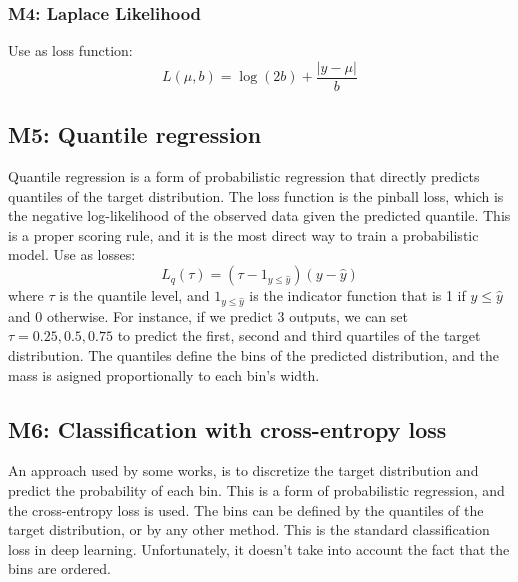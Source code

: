 \documentclass{article}
\begin{document}
\subsubsection{M4: Laplace Likelihood}
Use as loss function:
\begin{equation}
    L(\mu, b) = \log(2b) + \frac{|y - \mu|}{b}
\end{equation}  

\subsection{M5: Quantile regression}
Quantile regression is a form of probabilistic regression that directly predicts quantiles of the target distribution. The loss function is the pinball loss, which is the negative log-likelihood of the observed data given the predicted quantile. This is a proper scoring rule, and it is the most direct way to train a probabilistic model. Use as losses:
\begin{equation}
    L_q(\tau) = (\tau - \mathrm{1}_{y \leq \hat{y}})(y - \hat{y})
\end{equation}
where $\tau$ is the quantile level, and $\mathrm{1}_{y \leq \hat{y}}$ is the indicator function that is 1 if $y \leq \hat{y}$ and 0 otherwise. For instance, if we predict $3$ outputs, we can set $\tau = 0.25, 0.5, 0.75$ to predict the first, second and third quartiles of the target distribution. The quantiles define the bins of the predicted distribution, and the mass is asigned proportionally to each bin's width.  

\subsection{M6: Classification with cross-entropy loss}
An approach used by some works, is to discretize the target distribution and predict the probability of each bin. This is a form of probabilistic regression, and the cross-entropy loss is used. The bins can be defined by the quantiles of the target distribution, or by any other method. This is the standard classification loss in deep learning. Unfortunately, it doesn't take into account the fact that the bins are ordered. 
\end{document}
